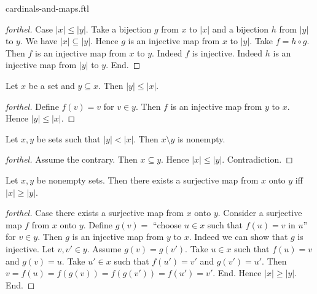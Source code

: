 \documentclass{naproche-library}
\begin{document}
\begin{smodule}{cardinals-and-maps.ftl}
\begin{proof}[forthel]
    Case $|x| \leq |y|$.
      Take a bijection $g$ from $x$ to $|x|$ and a bijection $h$ from $|y|$ to $y$.
      We have $|x| \subseteq |y|$.
      Hence $g$ is an injective map from $x$ to $|y|$.
      Take $f = h \circ g$.
      Then $f$ is an injective map from $x$ to $y$.
      Indeed $f$ is injective.
      Indeed $h$ is an injective map from $|y|$ to $y$.
    End.
  \end{proof}

  \begin{corollary}[forthel,id=SET_THEORY_06_4944303633727488,printid]
    Let $x$ be a set and $y \subseteq x$.
    Then $|y| \leq |x|$.
  \end{corollary}
  \begin{proof}[forthel]
    Define $f(v) = v$ for $v \in y$.
    Then $f$ is an injective map from $y$ to $x$.
    Hence $|y| \leq |x|$.
  \end{proof}

  \begin{corollary}[forthel,id=SET_THEORY_06_7746592696172544,printid]
    Let $x, y$ be sets such that $|y| < |x|$.
    Then $x \setminus y$ is nonempty.
  \end{corollary}
  \begin{proof}[forthel]
    Assume the contrary.
    Then $x \subseteq y$.
    Hence $|x| \leq |y|$.
    Contradiction.
  \end{proof}

  \begin{proposition}[forthel,id=SET_THEORY_06_192336220913664,printid]
    Let $x, y$ be nonempty sets.
    Then there exists a surjective map from $x$ onto $y$ iff $|x| \geq |y|$.
  \end{proposition}
  \begin{proof}[forthel]
    Case there exists a surjective map from $x$ onto $y$.
      Consider a surjective map $f$ from $x$ onto $y$.
      Define $g(v) =$ ``choose $u \in x$ such that $f(u) = v$ in $u$'' for $v \in y$.
      Then $g$ is an injective map from $y$ to $x$.
      Indeed we can show that $g$ is injective.
        Let $v, v' \in y$.
        Assume $g(v) = g(v')$.
        Take $u \in x$ such that $f(u) = v$ and $g(v) = u$.
        Take $u' \in x$ such that $f(u') = v'$ and $g(v') = u'$.
        Then $v
          = f(u)
          = f(g(v))
          = f(g(v'))
          = f(u')
          = v'$.
      End.
      Hence $|x| \geq |y|$.
    End.


\end{proof}
\end{smodule}
\end{document}
